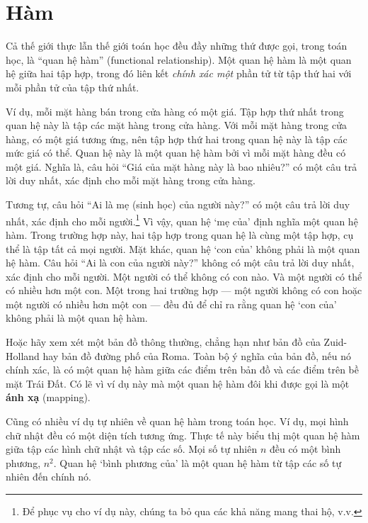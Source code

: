 
\section{Hàm}

Cả thế giới thực lẫn thế giới toán học đều đầy những thứ được gọi, trong toán học, là ``quan hệ hàm'' (functional relationship). Một quan hệ hàm là một quan hệ giữa hai tập hợp, trong đó liên kết \emph{chính xác một} phần tử từ tập thứ hai với mỗi phần tử của tập thứ nhất.

Ví dụ, mỗi mặt hàng bán trong cửa hàng có một giá. Tập hợp thứ nhất trong quan hệ này là tập các mặt hàng trong cửa hàng. Với mỗi mặt hàng trong cửa hàng, có một giá tương ứng, nên tập hợp thứ hai trong quan hệ này là tập các mức giá có thể. Quan hệ này là một quan hệ hàm bởi vì mỗi mặt hàng đều có một giá. Nghĩa là, câu hỏi ``Giá của mặt hàng này là bao nhiêu?'' có một câu trả lời duy nhất, xác định cho mỗi mặt hàng trong cửa hàng.

Tương tự, câu hỏi ``Ai là mẹ (sinh học) của người này?'' có một câu trả lời duy nhất, xác định cho mỗi người.\footnote{Để phục vụ cho ví dụ này, chúng ta bỏ qua các khả năng mang thai hộ, v.v.} Vì vậy, quan hệ `mẹ của' định nghĩa một quan hệ hàm. Trong trường hợp này, hai tập hợp trong quan hệ là cùng một tập hợp, cụ thể là tập tất cả mọi người. Mặt khác, quan hệ `con của' không phải là một quan hệ hàm. Câu hỏi ``Ai là con của người này?'' không có một câu trả lời duy nhất, xác định cho mỗi người. Một người có thể không có con nào. Và một người có thể có nhiều hơn một con. Một trong hai trường hợp --- một người không có con hoặc một người có nhiều hơn một con --- đều đủ để chỉ ra rằng quan hệ `con của' không phải là một quan hệ hàm.

Hoặc hãy xem xét một bản đồ thông thường, chẳng hạn như bản đồ của Zuid-Holland hay bản đồ đường phố của Roma. Toàn bộ ý nghĩa của bản đồ, nếu nó chính xác, là có một quan hệ hàm giữa các điểm trên bản đồ và các điểm trên bề mặt Trái Đất. Có lẽ vì ví dụ này mà một quan hệ hàm đôi khi được gọi là một \textbf{ánh xạ} (mapping).

Cũng có nhiều ví dụ tự nhiên về quan hệ hàm trong toán học. Ví dụ, mọi hình chữ nhật đều có một diện tích tương ứng. Thực tế này biểu thị một quan hệ hàm giữa tập các hình chữ nhật và tập các số. Mọi số tự nhiên $n$ đều có một bình phương, $n^2$. Quan hệ `bình phương của' là một quan hệ hàm từ tập các số tự nhiên đến chính nó.

